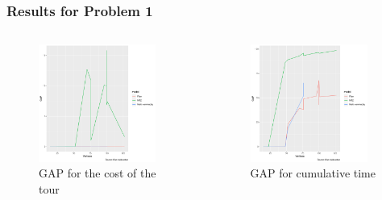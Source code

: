 \documentclass[aspectratio=169]{beamer}
\begin{document}
{\begin{frame}
\frametitle{Results for Problem 1}
\begin{columns}
\begin{figure}[ht]
\centering
\includegraphics[width=0.9\textwidth]{images/figure:2a.pdf}
\caption{GAP for the cost of the tour}
\end{figure}
 

\begin{figure}[ht]
\centering
\includegraphics[width=0.9\textwidth]{images/figure:2b.pdf}
\caption{GAP for cumulative time}
\end{figure}
\end{columns}
\end{frame}


}
\end{document}

